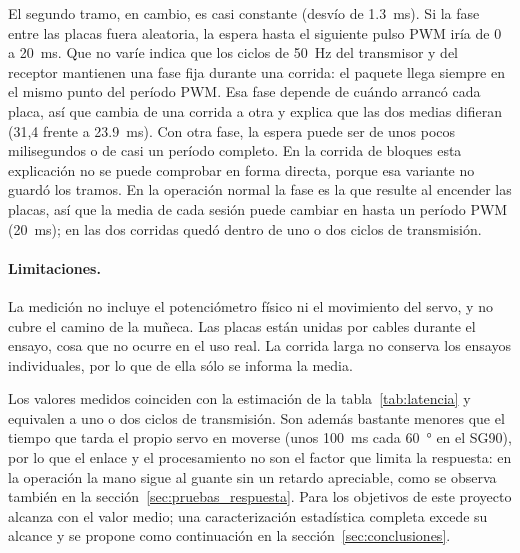 El segundo tramo, en cambio, es casi constante (desvío de \SI{1.3}{\milli\second}). Si la fase entre las placas fuera aleatoria, la espera hasta el siguiente pulso PWM iría de 0 a \SI{20}{\milli\second}. Que no varíe indica que los ciclos de \SI{50}{\hertz} del transmisor y del receptor mantienen una fase fija durante una corrida: el paquete llega siempre en el mismo punto del período PWM. Esa fase depende de cuándo arrancó cada placa, así que cambia de una corrida a otra y explica que las dos medias difieran (31,4 frente a \SI{23.9}{\milli\second}). Con otra fase, la espera puede ser de unos pocos milisegundos o de casi un período completo. En la corrida de bloques esta explicación no se puede comprobar en forma directa, porque esa variante no guardó los tramos. En la operación normal la fase es la que resulte al encender las placas, así que la media de cada sesión puede cambiar en hasta un período PWM (\SI{20}{\milli\second}); en las dos corridas quedó dentro de uno o dos ciclos de transmisión.

\paragraph{Limitaciones.} La medición no incluye el potenciómetro físico ni el movimiento del servo, y no cubre el camino de la muñeca. Las placas están unidas por cables durante el ensayo, cosa que no ocurre en el uso real. La corrida larga no conserva los ensayos individuales, por lo que de ella sólo se informa la media.

Los valores medidos coinciden con la estimación de la tabla~\ref{tab:latencia} y equivalen a uno o dos ciclos de transmisión. Son además bastante menores que el tiempo que tarda el propio servo en moverse (unos \SI{100}{\milli\second} cada \SI{60}{\degree} en el SG90), por lo que el enlace y el procesamiento no son el factor que limita la respuesta: en la operación la mano sigue al guante sin un retardo apreciable, como se observa también en la sección~\ref{sec:pruebas_respuesta}. Para los objetivos de este proyecto alcanza con el valor medio; una caracterización estadística completa excede su alcance y se propone como continuación en la sección~\ref{sec:conclusiones}.
